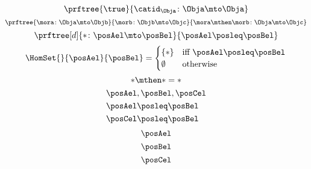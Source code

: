 {\begin{forslides}
\begin{equation*}
        \end{equation*}
        \begin{equation*}
            \label{eq:id_ex}
            \prftree{\true}{\catid_\Obja\colon \Obja \mto \Obja}
        \end{equation*}
        \begin{equation*}
            \label{eq:comp_cat}
            \prftree{\mora \colon \Obja \mto \Objb}{\morb\colon \Objb \mto \Objc}{\mora\mthen \morb \colon \Obja \mto \Objc}
        \end{equation*}
        \begin{equation*}
            \label{eq:mor_pre}
            \prftree[d]{\ast\colon \posAel \mto \posBel}{\posAel \posleq \posBel}
        \end{equation*}
        \begin{equation*}
            \label{eq:hom_pre}
            \HomSet{}{\posAel}{\posBel}=\begin{cases}
                \{\ast\}  & \text{iff } \posAel \posleq \posBel \\
                \emptyset & \text{otherwise}
            \end{cases}
        \end{equation*}
        \begin{equation*}
            \label{eq:comp_pre}
            \ast \mthen \ast = \ast
        \end{equation*}
        \begin{equation*}
            \label{eq:ex_pre}
            \begin{aligned}
                 & \posAel,\posBel,\posCel \\
                 & \posAel \posleq \posBel \\
                 & \posCel \posleq \posBel
            \end{aligned}
        \end{equation*}
        \begin{equation*}
            \label{eq:pre_p}
            \posAel
        \end{equation*}
        \begin{equation*}
            \label{eq:pre_q}
            \posBel
        \end{equation*}
        \begin{equation*}
            \label{eq:pre_r}
            \posCel
        \end{equation*}
        \begin{equation*}
            \label{eq:eq_rel}

\end{equation*}
\end{forslides}}
